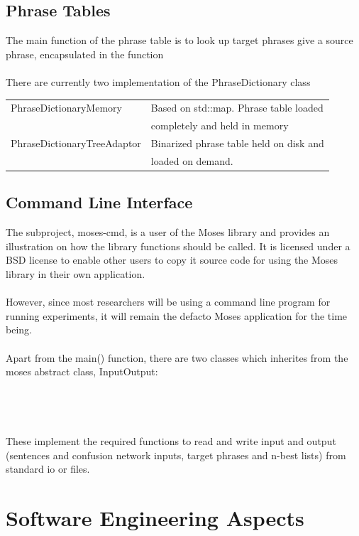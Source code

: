 \documentclass[11pt]{report}
\theoremstyle{plain}
\begin{document}
{\subsection{Phrase Tables}	
The main function of the phrase table is to look up target phrases give a source phrase, encapsulated in the function\\
\\
There are currently two implementation of the PhraseDictionary class\\
\begin{tabular}{|l|l|}
\hline
PhraseDictionaryMemory & Based on std::map. Phrase table loaded\\ 
 & completely and held in memory\\
PhraseDictionaryTreeAdaptor & Binarized phrase table held on disk and \\
 & loaded on demand.\\
\hline
\end{tabular}
\subsection{Command Line Interface}
The subproject, moses-cmd, is a user of the Moses library and provides an illustration on how the library functions should be called. It is licensed under a BSD license to enable other users to copy it source code for using the Moses library in their own application.\\
\\
However, since most researchers will be using a command line program for running experiments, it will remain the defacto Moses application for the time being.\\
\\
Apart from the main() function, there are two classes which inherites from the moses abstract class, InputOutput:\\
\\
\\
\\
\\
These implement the required functions to read and write input and output (sentences and confusion network inputs, target phrases and n-best lists) from standard io or files.





\section{Software Engineering Aspects}

}
\end{document}
